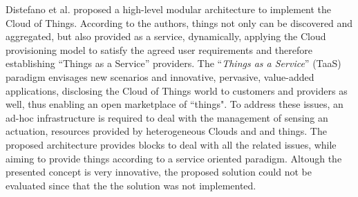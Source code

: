 Distefano \cite{distefano2012enabling} et al. proposed a high-level modular architecture to implement the
Cloud of Things. According to the authors, things not only can be discovered and aggregated, but also
provided as a service, dynamically, applying the Cloud provisioning model to satisfy the agreed
user requirements and therefore establishing ``Things as a Service'' providers. The ``\textit{Things as a Service}''
(TaaS) paradigm envisages new scenarios and innovative, pervasive, value-added applications,
disclosing the Cloud of Things world to customers and providers as well, thus enabling an open
marketplace of ``things". To address these issues, an ad-hoc infrastructure is required to deal
with the management of sensing an actuation, resources provided by heterogeneous Clouds and
and things. The proposed architecture provides blocks to deal with all the related issues, while aiming
to provide things according to a service oriented paradigm. Altough the presented concept is
very innovative, the proposed solution could not be evaluated since that the the solution was
not implemented.\\

